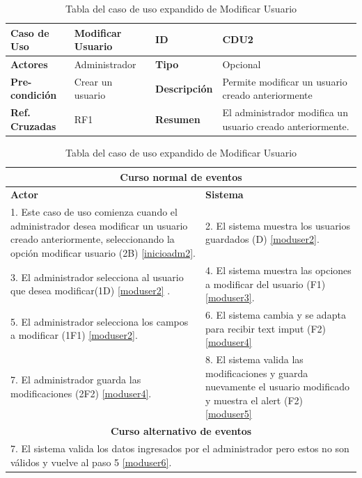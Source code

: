 \begin{table}
	\centering
	\begin{tabular}{|p{3cm}|p{3cm}|p{2cm} |p{3cm}|}
		\hline \textbf{Caso de Uso} & Modificar Usuario & \textbf{ID} & CDU2 \\ 
		\hline \textbf{Actores} & Administrador & \textbf{Tipo} & Opcional \\ 
		\hline \textbf{Pre-condición} & Crear un usuario & \textbf{Descripción} & Permite modificar un usuario creado anteriormente \\
		\hline \textbf{Ref. Cruzadas} & RF1 & \textbf{Resumen} & El administrador modifica un usuario creado anteriormente.\\ 
		\hline
	\end{tabular}  
	
	\begin{tabular}{|p{6cm}|p{6cm}|}
		
		\multicolumn{2}{|c|}{\textbf{Curso normal de eventos}} \\
		\hline \textbf{Actor} & \textbf{Sistema} \\ 
		\hline 1. Este caso de uso comienza cuando el administrador desea modificar un usuario creado anteriormente, seleccionando la opción modificar usuario (2B) \ref{inicioadm2}. & 2. El sistema muestra los usuarios guardados (D) \ref{moduser2}. \\ 
		3. El administrador selecciona al usuario que desea modificar(1D) \ref{moduser2} . & 4. El sistema muestra las opciones a modificar del usuario (F1) \ref{moduser3}.\\
		5. El administrador selecciona los campos a modificar (1F1) \ref{moduser2}. & 6. El sistema cambia y se adapta para recibir text imput (F2) \ref{moduser4} \\
		7. El administrador guarda las modificaciones (2F2) \ref{moduser4}. & 8. El sistema valida las modificaciones y guarda nuevamente el usuario modificado y muestra el alert (F2) \ref{moduser5} \\
		\hline
		\multicolumn{2}{|c|}{\textbf{Curso alternativo de eventos}} \\
		\hline
		\multicolumn{2}{|p{12cm}|}{7. El sistema valida los datos ingresados por el administrador pero estos no son válidos y vuelve al paso 5 \ref{moduser6}. } \\
		\hline
	\end{tabular}
	\caption{Tabla del caso de uso expandido de Modificar Usuario}
	\label{tabcdu22}
\end{table}

